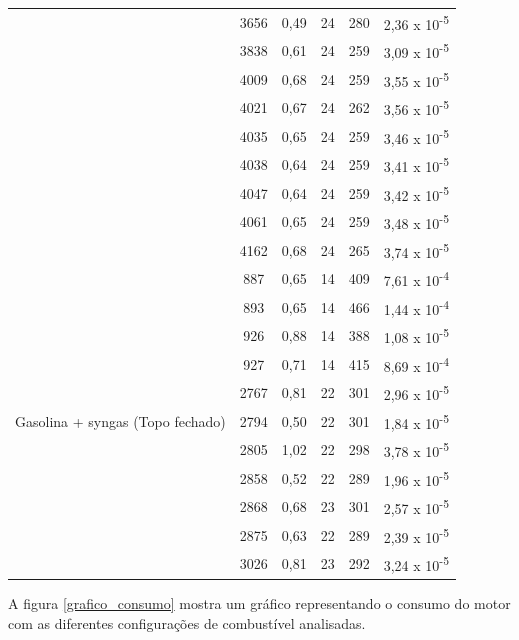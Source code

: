 \begin{table}[h]
\begin{tabular}{|c|c|c|c|c|c|}
		& 3656 & 0,49 & 24 & 280 & 2,36 x 10\textsuperscript{-5}\\
		& 3838 & 0,61 & 24 & 259 & 3,09 x 10\textsuperscript{-5}\\
		& 4009 & 0,68 & 24 & 259 & 3,55 x 10\textsuperscript{-5}\\
		& 4021 & 0,67 & 24 & 262 & 3,56 x 10\textsuperscript{-5}\\
		& 4035 & 0,65 & 24 & 259 & 3,46 x 10\textsuperscript{-5}\\
		& 4038 & 0,64 & 24 & 259 & 3,41 x 10\textsuperscript{-5}\\
		& 4047 & 0,64 & 24 & 259 & 3,42 x 10\textsuperscript{-5}\\
		& 4061 & 0,65 & 24 & 259 & 3,48 x 10\textsuperscript{-5}\\
		& 4162 & 0,68 & 24 & 265 & 3,74 x 10\textsuperscript{-5}\\
		\hline
		\multirow{12}{4.5cm}{Gasolina + syngas (Topo fechado)}
		& 887 & 0,65 & 14 & 409 & 7,61 x 10\textsuperscript{-4}\\
		& 893 & 0,65 & 14 & 466 & 1,44 x 10\textsuperscript{-4}\\
		& 926 & 0,88 & 14 & 388 & 1,08 x 10\textsuperscript{-5}\\
		& 927 & 0,71 & 14 & 415 & 8,69 x 10\textsuperscript{-4}\\
		& 2767 & 0,81 & 22 & 301 & 2,96 x 10\textsuperscript{-5}\\
		& 2794 & 0,50 & 22 & 301 & 1,84 x 10\textsuperscript{-5}\\
		& 2805 & 1,02 & 22 & 298 & 3,78 x 10\textsuperscript{-5}\\
		& 2858 & 0,52 & 22 & 289 & 1,96 x 10\textsuperscript{-5}\\
		& 2868 & 0,68 & 23 & 301 & 2,57 x 10\textsuperscript{-5}\\
		& 2875 & 0,63 & 22 & 289 & 2,39 x 10\textsuperscript{-5}\\
		& 3026 & 0,81 & 23 & 292 & 3,24 x 10\textsuperscript{-5}\\	
		\hline
	\end{tabular}
	\label{tabela_resultados}
\end{table}	

A figura \ref{grafico_consumo} mostra um gráfico representando o consumo do motor com as diferentes configurações de combustível analisadas.

